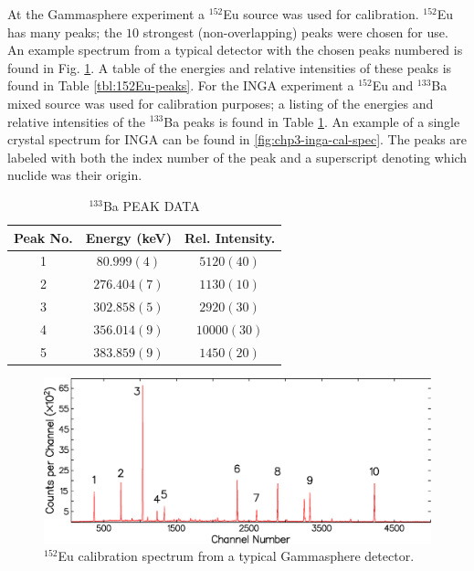 At the Gammasphere experiment a $^{152}$Eu source was used for calibration. $^{152}$Eu has many peaks; the $10$ strongest (non-overlapping) peaks were chosen for use. An example spectrum from a typical detector with the chosen peaks numbered is found in Fig. \ref{fig:chp3-gs-cal-spec}.  A table of the energies and relative intensities of these peaks is found in Table \ref{tbl:152Eu-peaks}. For the INGA experiment a $^{152}$Eu and $^{133}$Ba mixed source was used for calibration purposes; a listing of the energies and relative intensities of the $^{133}$Ba peaks is found in Table \ref{tbl:133Ba-peaks}. An example of a single crystal spectrum for INGA can be found in \ref{fig:chp3-inga-cal-spec}. The peaks are labeled with both the index number of the peak and a superscript denoting which nuclide was their origin.

\begin{table}[hT!]
\caption{$^{133}$Ba PEAK DATA \label{tbl:133Ba-peaks}}
\begin{center}
\begin{tabular}{ccc}
\toprule
Peak No. & Energy (keV) & Rel. Intensity. \\ 
\midrule
1 & $80.999(4)$ & $5120(40)$ \\ 
2 & $276.404(7)$ & $1130(10)$ \\ 
3 & $302.858(5)$ & $2920(30)$ \\ 
4 & $356.014(9)$ & $10000(30)$ \\ 
5 & $383.859(9)$ & $1450(20)$ \\ 
\bottomrule
\end{tabular} 
\end{center}
\end{table}

\begin{figure}[h!]
	\setlength{\capwidth}{\textwidth}
	\centerline{\includegraphics[height=0.25\textheight]{./img/c3/gs_cal_spec.eps}}
	\caption{$^{152}$Eu calibration spectrum from a typical Gammasphere detector.}
	\label{fig:chp3-gs-cal-spec}
	\setlength{\capwidth}{0.9\textwidth}
\end{figure}

